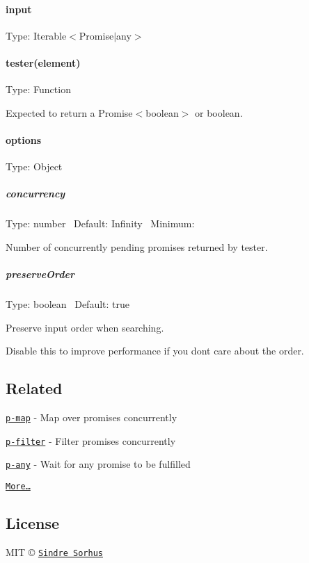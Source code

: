 \paragraph*{input}

Type\+: {\ttfamily Iterable$<$Promise$\vert$any$>$}

\paragraph*{tester(element)}

Type\+: {\ttfamily Function}

Expected to return a {\ttfamily Promise$<$boolean$>$} or boolean.

\paragraph*{options}

Type\+: {\ttfamily Object}

\subparagraph*{concurrency}

Type\+: {\ttfamily number}~\newline
 Default\+: {\ttfamily Infinity}~\newline
 Minimum\+: {}

Number of concurrently pending promises returned by {\ttfamily tester}.

\subparagraph*{preserve\+Order}

Type\+: {\ttfamily boolean}~\newline
 Default\+: {\ttfamily true}

Preserve {\ttfamily input} order when searching.

Disable this to improve performance if you don\textquotesingle{}t care about the order.

\subsection*{Related}


\begin{DoxyItemize}
\item \href{https://github.com/sindresorhus/p-map}{\tt p-\/map} -\/ Map over promises concurrently
\item \href{https://github.com/sindresorhus/p-filter}{\tt p-\/filter} -\/ Filter promises concurrently
\item \href{https://github.com/sindresorhus/p-any}{\tt p-\/any} -\/ Wait for any promise to be fulfilled
\item \href{https://github.com/sindresorhus/promise-fun}{\tt More…}
\end{DoxyItemize}

\subsection*{License}

M\+IT © \href{https://sindresorhus.com}{\tt Sindre Sorhus} 